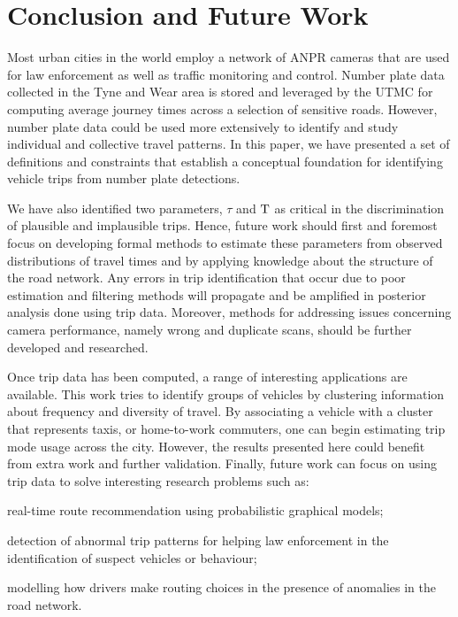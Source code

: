 \section{Conclusion and Future Work}\label{s.conclusions}

Most urban cities in the world employ a network of ANPR cameras that are used for law enforcement as well as traffic monitoring and control. Number plate data collected in the Tyne and Wear area is stored and leveraged by the UTMC for computing average journey times across a selection of sensitive roads. However, number plate data could be used more extensively to identify and study individual and collective travel patterns. In this paper, we have presented a set of definitions and constraints that establish a conceptual foundation for identifying vehicle trips from number plate detections.

We have also identified two parameters, $\tau$ and $\mathrm{T}$ as critical in the discrimination of plausible and implausible trips. Hence, future work should first and foremost focus on developing formal methods to estimate these parameters from observed distributions of travel times and by applying knowledge about the structure of the road network. Any errors in trip identification that occur due to poor estimation and filtering methods will propagate and be amplified in posterior analysis done using trip data. Moreover, methods for addressing issues concerning camera performance, namely wrong and duplicate scans, should be further developed and researched.

Once trip data has been computed, a range of interesting applications are available. This work tries to identify groups of vehicles by clustering information about frequency and diversity of travel. By associating a vehicle with a cluster that represents taxis, or home-to-work commuters, one can begin estimating trip mode usage across the city. However, the results presented here could benefit from extra work and further validation. Finally, future work can focus on using trip data to solve interesting research problems such as:
\begin{enumerate*}[label=(\roman*)]
  \item real-time route recommendation using probabilistic graphical models;
  \item detection of abnormal trip patterns for helping law enforcement in the identification of suspect vehicles or behaviour;
  \item modelling how drivers make routing choices in the presence of anomalies in the road network.
\end{enumerate*}
